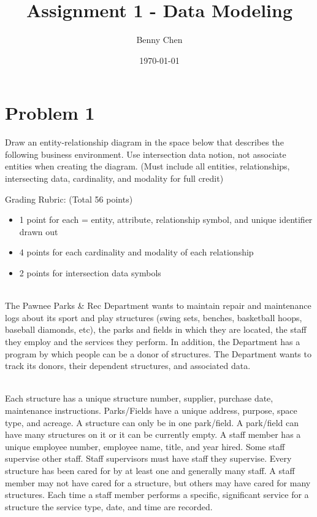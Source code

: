 \documentclass{article}
\title{Assignment 1 - Data Modeling}
\author{Benny Chen}
\date{\today}
\begin{document}
\maketitle

\section*{Problem 1}

Draw an entity-relationship diagram in the space below that describes the following business environment. Use intersection data notion, not associate entities when creating the diagram. (Must include all entities, relationships, intersecting data, cardinality, and modality for full credit)

Grading Rubric: (Total 56 points)

\begin{itemize}
    \item 1 point for each = entity, attribute, relationship symbol, and unique identifier drawn out
    \item 4 points for each cardinality and modality of each relationship
    \item 2 points for intersection data symbols
\end{itemize}

\noindent\\
The Pawnee Parks \& Rec Department wants to maintain repair and maintenance logs about its sport and play structures (swing sets, benches, basketball hoops, baseball diamonds, etc), the parks and fields in which they are located, the staff they employ and the services they perform. In addition, the Department has a program by which people can be a donor of structures. The Department wants to track its donors, their dependent structures, and associated data.

\noindent\\
Each structure has a unique structure number, supplier, purchase date, maintenance instructions. Parks/Fields have a unique address, purpose, space type, and acreage. A structure can only be in one park/field. A park/field can have many structures on it or it can be currently empty. A staff member has a unique employee number, employee name, title, and year hired. Some staff supervise other staff. Staff supervisors must have staff they supervise. Every structure has been cared for by at least one and generally many staff. A staff member may not have cared for a structure, but others may have cared for many structures. Each time a staff member performs a specific, significant service for a structure the service type, date, and time are recorded.
\end{document}
